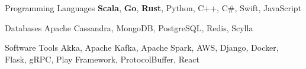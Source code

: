 

\begin{cvskills}

  \cvskill
    {Programming Languages} %
    {{\bf Scala}, {\bf Go}, {\bf Rust}, Python, C++, C\#, Swift, JavaScript} %

  \cvskill
    {Databases} %
    {Apache Cassandra, MongoDB, PostgreSQL, Redis, Scylla} %

  \cvskill
    {Software Tools} %
    {Akka, Apache Kafka, Apache Spark, AWS, Django, Docker, Flask, gRPC, Play Framework, ProtocolBuffer, React} %

\end{cvskills}
